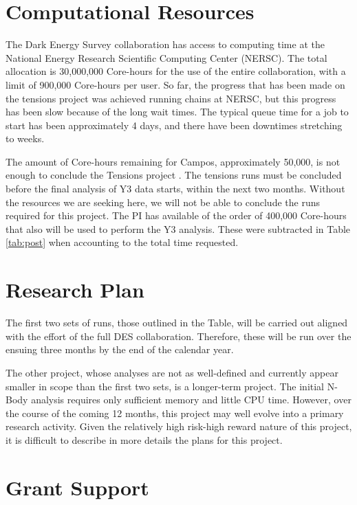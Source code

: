 \documentclass[12pt]{article}
\begin{document}
\begin{small}
\section{Computational Resources}

The Dark Energy Survey collaboration has access to computing time at the National Energy Research Scientific Computing Center (NERSC). The total allocation is 30,000,000 Core-hours for the use of the entire collaboration, with a  limit of 900,000 Core-hours per user. So far, the progress that has been made on the tensions project was achieved running chains at NERSC, but this progress has been slow because of the long wait times. The typical queue time for a job to start has been approximately 4 days, and there have been downtimes stretching to weeks. 

The amount of Core-hours remaining for Campos, approximately 50,000, is not enough to conclude the Tensions project . The tensions runs must be concluded before the final analysis of Y3 data starts, within the next two months. Without the resources we are seeking here, we will not be able to conclude the runs required for this project. The PI has available of the order of 400,000 Core-hours that also will be used to perform the Y3 analysis. These were subtracted in Table \ref{tab:post} when accounting to the total time requested.




\section{Research Plan}

The first two sets of runs, those outlined in the Table, will be carried out aligned with the effort of the full DES collaboration. Therefore, these will be run over the ensuing three months by the end of the calendar year.

The other project, whose analyses are not as well-defined and currently appear smaller in scope than the first two sets, is a longer-term project. The initial N-Body analysis requires only sufficient memory and little CPU time. However, over the course of the coming 12 months, this project may well evolve into a primary research activity. Given the relatively high risk-high reward nature of this project, it is difficult to describe in more details the plans for this project.

\section{Grant Support}


\end{small}
\end{document}
